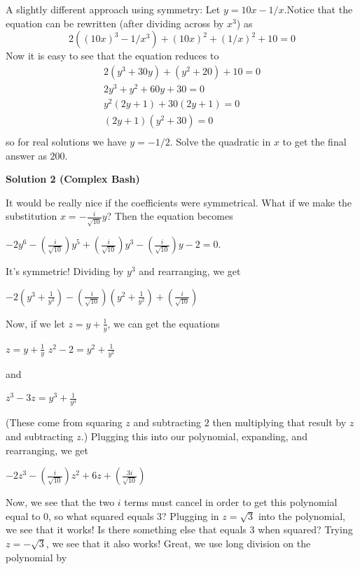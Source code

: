 \begin{enumerate}
 A slightly different approach using symmetry:
Let $y = 10x - 1/x$.Notice that the equation can be rewritten (after dividing across by $x^3$) as 
 \[2( (10x)^3 - 1/x^3 ) + (10x)^2 + (1/x)^2 + 10 = 0\]Now it is easy to see that the equation reduces to 
 \begin{align*} 2(y^3+30y)+ (y^2+20) + 10 = 0 \\ 2y^3 + y^2 + 60y + 30 = 0 \\ y^2(2y+1) + 30(2y+1) = 0 \\ (2y+1)(y^2+30)= 0 \\ \end{align*}
so for real solutions we have $y = -1/2$. Solve the quadratic in $x$ to get the final answer as $\boxed{200}$.

 



\textbf{Solution 2 (Complex Bash)}

It would be really nice if the coefficients were symmetrical. What if we make the substitution $x = -\frac{i}{\sqrt{10}}y$? Then the equation becomes 

 $-2y^6 - \left(\frac{i}{\sqrt{10}}\right)y^5 + \left(\frac{i}{\sqrt{10}}\right)y^3 - \left(\frac{i}{\sqrt{10}}\right)y - 2 = 0$.

 It's symmetric! Dividing by $y^3$ and rearranging, we get 

 $-2\left(y^3 + \frac{1}{y^3}\right) - \left(\frac{i}{\sqrt{10}}\right)\left(y^2 + \frac{1}{y^2}\right) + \left(\frac{i}{\sqrt{10}}\right)$

 Now, if we let $z = y + \frac{1}{y}$, we can get the equations 

 $z = y + \frac{1}{y}$
$z^2 - 2 = y^2 + \frac{1}{y^2}$

 and

 $z^3 - 3z = y^3 + \frac{1}{y^3}$

 (These come from squaring $z$ and subtracting $2$ then multiplying that result by $z$ and subtracting $z$.) Plugging this into our polynomial, expanding, and rearranging, we get 

 $-2z^3 - \left(\frac{i}{\sqrt{10}}\right)z^2 + 6z + \left(\frac{3i}{\sqrt{10}}\right)$

 Now, we see that the two $i$ terms must cancel in order to get this polynomial equal to $0$, so what squared equals 3? Plugging in $z = \sqrt{3}$ into the polynomial, we see that it works! Is there something else that equals 3 when squared? Trying $z = -\sqrt{3}$, we see that it also works! Great, we use long division on the polynomial by 


\end{enumerate}
